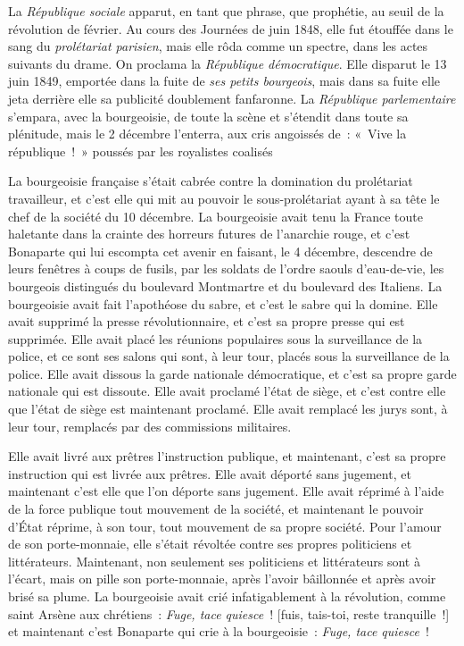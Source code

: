 \documentclass[french,twoside]{book} %
\newcommand\chaptercont{} %
\begin{document}
\chaptercont
\noindent La \emph{République sociale} apparut, en tant que phrase, que prophétie, au seuil de la révolution de février. Au cours des Journées de juin 1848, elle fut étouffée dans le sang du \emph{prolétariat parisien}, mais elle rôda comme un spectre, dans les actes suivants du drame. On proclama la \emph{République démocratique}. Elle disparut le 13 juin 1849, emportée dans la fuite de \emph{ses petits bourgeois}, mais dans sa fuite elle jeta derrière elle sa publicité doublement fanfaronne. La \emph{République parlementaire} s’empara, avec la bourgeoisie, de toute la scène et s’étendit dans toute sa plénitude, mais le 2 décembre l’enterra, aux cris angoissés de : « Vive la république ! » poussés par les royalistes coalisés\par
La bourgeoisie française s’était cabrée contre la domination du prolétariat travailleur, et c’est elle qui mit au pouvoir le sous-prolétariat ayant à sa tête le chef de la société du 10 décembre. La bourgeoisie avait tenu la France toute haletante dans la crainte des horreurs futures de l’anarchie rouge, et c’est Bonaparte qui lui escompta cet avenir en faisant, le 4 décembre, descendre de leurs fenêtres à coups de fusils, par les soldats de l’ordre saouls d’eau-de-vie, les bourgeois distingués du boulevard Montmartre et du boulevard des Italiens. La bourgeoisie avait fait l’apothéose du sabre, et c’est le sabre qui la domine. Elle avait supprimé la presse révolutionnaire, et c’est sa propre presse qui est supprimée. Elle avait placé les réunions populaires sous la surveillance de la police, et ce sont ses salons qui sont, à leur tour, placés sous la surveillance de la police. Elle avait dissous la garde nationale démocratique, et c’est sa propre garde nationale qui est dissoute. Elle avait proclamé l’état de siège, et c’est contre elle que l’état de siège est maintenant proclamé. Elle avait remplacé les jurys sont, à leur tour, remplacés par des commissions militaires.\par
Elle avait livré aux prêtres l’instruction publique, et maintenant, c’est sa propre instruction qui est livrée aux prêtres. Elle avait déporté sans jugement, et maintenant c’est elle que l’on déporte sans jugement. Elle avait réprimé à l’aide de la force publique tout mouvement de la société, et maintenant le pouvoir d’État réprime, à son tour, tout mouvement de sa propre société. Pour l’amour de son porte-monnaie, elle s’était révoltée contre ses propres politiciens et littérateurs. Maintenant, non seulement ses politiciens et littérateurs sont à l’écart, mais on pille son porte-monnaie, après l’avoir bâillonnée et après avoir brisé sa plume. La bourgeoisie avait crié infatigablement à la révolution, comme saint Arsène aux chrétiens : \emph{Fuge, tace quiesce} ! [fuis, tais-toi, reste tranquille !] et maintenant c’est Bonaparte qui crie à la bourgeoisie : \emph{Fuge, tace quiesce} !\par
\end{document}

